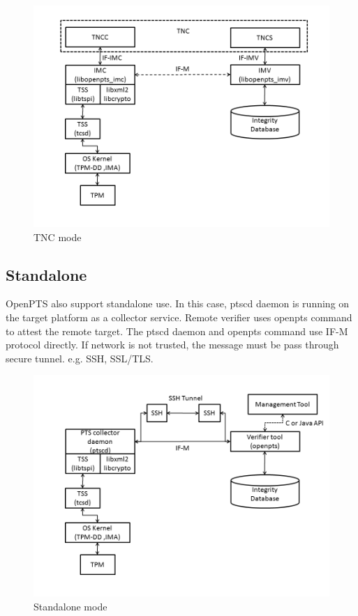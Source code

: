 \documentclass[12pt,a4paper]{article}
\begin{document}
\begin{figure}[b!p]
  \begin{center}
    \includegraphics[width=15cm]{OpenPTS_fig_tnc.png}
  \end{center}
  \caption{TNC mode}
  \label{fig:openptstnc}
\end{figure}

\clearpage 

\subsection{Standalone}

OpenPTS also support standalone use. 
In this case, ptscd daemon is running on the target platform as a collector service. 
Remote verifier uses openpts command to attest the remote target.
The ptscd daemon and openpts command use IF-M protocol directly.
If network is not trusted, the message must be pass through secure tunnel. e.g. SSH, SSL/TLS.
 

\begin{figure}[b!p]
  \begin{center}
    \includegraphics[width=15cm]{OpenPTS_fig_standalone.png}
  \end{center}
  \caption{Standalone mode}
  \label{tncfig} 
\end{figure}
\end{document}
